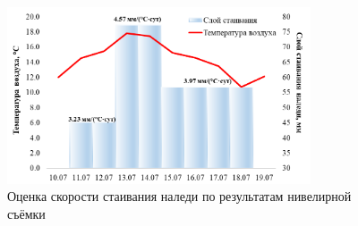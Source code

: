 \begin{figure}[h!]
  \begin{center}
    \includegraphics[width=0.8\textwidth]{authors/zemlaykova-1-fig-2.png}
  \end{center}
  \caption{Оценка скорости стаивания наледи по результатам нивелирной съёмки}
  \label{fig:zemlaykova-1-fig-2}
\end{figure}
